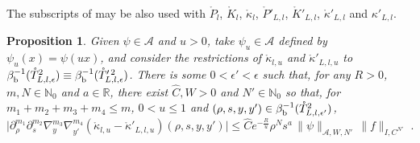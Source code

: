 \documentclass{memo-l}
\theoremstyle{plain}
\newtheorem{prop}[thm]{Proposition}
\theoremstyle{definition}
\theoremstyle{remark}
\newcommand{\N}{\mathbb{N}}
\newcommand{\R}{\mathbb{R}}
\renewcommand{\AA}{\mathcal{A}}
\numberwithin{section}{chapter}
\numberwithin{equation}{section}%
\begin{document}
The subscripts of  may be also used with $\mathring P_l$, $\mathring K_l$, $\mathring\kappa_l$, $\mathring P'_{L,l}$, $\mathring K'_{L,l}$, $\mathring\kappa'_{L,l}$ and $\kappa'_{L,l}$.

\begin{prop}\label{p: P equiv P'}
Given $\psi\in\AA$ and $u>0$, take $\psi_u\in\AA$ defined by $\psi_u(x)=\psi(ux)$, and consider the restrictions of $\mathring\kappa_{l,u}$ and $\mathring\kappa'_{L,l,u}$ to $\beta_{\text{\rm b}}^{-1}(\mathring T_{L,l,\epsilon}^2)\equiv\beta_{\text{\rm b}}^{-1}(\mathring T^{\prime\,2}_{L,l,\epsilon})$. There is some $0<\epsilon'<\epsilon$ such that, for any $R>0$, $m,N\in\N_0$ and $a\in\R$, there exist $\widehat C,W>0$ and $N'\in\N_0$ so that, for $m_1+m_2+m_3+m_4\le m$, $0<u\le1$ and $(\rho,s, y, y')\in\beta_{\text{\rm b}}^{-1}(\mathring T_{L,l,\epsilon'}^2)$,
\[
\big|\partial^{m_1}_\rho\partial^{m_2}_s\nabla^{m_3}_y\nabla^{m_4}_{y'}(\mathring\kappa_{l,u}-\mathring\kappa'_{L,l,u})(\rho,s, y, y')\big| 
\le\widehat Ce^{-\frac{R}{u}}\rho^Ns^{a}\,\|\psi\|_{\AA,W,N'}\,\|f\|_{I,C^{N'}}\;.
\]
\end{prop}
\end{document}
